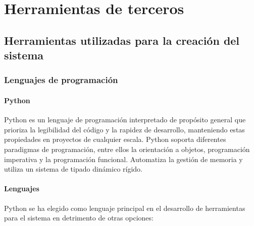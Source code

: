 \chapter{Herramientas de terceros}

\section{Herramientas utilizadas para la creación del sistema}



\subsection{Lenguajes de programación}

\subsubsection{Python}
Python es un lenguaje de programación interpretado de propósito general que prioriza la legibilidad del  código y la rapidez de desarrollo, manteniendo estas propiedades en proyectos de cualquier escala. Python soporta diferentes paradigmas de programación, entre ellos la orientación a objetos, programación imperativa y la programación funcional. Automatiza la gestión de memoria y utiliza un sistema de tipado dinámico rígido\citationneeded.

\subsubsection{Lenguajes}

Python se ha elegido como lenguaje principal en el desarrollo de herramientas para el sistema en detrimento de otras opciones:

